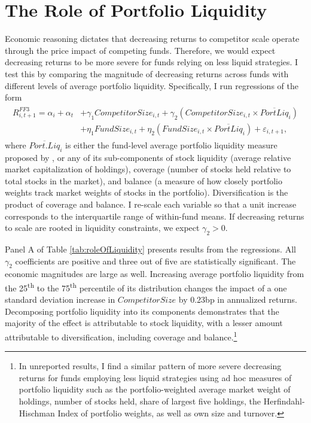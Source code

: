 \documentclass[openany]{book}
\let\rmarkdownfootnote\footnote%
\def\footnote{\protect\rmarkdownfootnote}
\theoremstyle{definition}
\theoremstyle{definition}
\theoremstyle{definition}
\theoremstyle{remark}
\begin{document}
\hypertarget{sec:heterogeneity}{%
\section{The Role of Portfolio Liquidity}\label{sec:heterogeneity}}

Economic reasoning dictates that decreasing returns to competitor scale
operate through the price impact of competing funds. Therefore, we would
expect decreasing returns to be more severe for funds relying on less
liquid strategies. I test this by comparing the magnitude of decreasing
returns across funds with different levels of average portfolio
liquidity. Specifically, I run regressions of the form \begin{align}
\begin{split}
R^{FF3}_{i,t+1} = \alpha_i + \alpha_t &+ \gamma_1 CompetitorSize_{i,t} + \gamma_2 \left( CompetitorSize_{i,t} \times \overline{PortLiq}_{i} \right) \\ 
&+ \eta_1 FundSize_{i,t} + \eta_2 \left( FundSize_{i,t} \times \overline{PortLiq}_i \right) + \varepsilon_{i,t+1},
\end{split}
\label{eq:AvgLiqReg}
\end{align} where \(\overline{Port.Liq}_i\) is either the fund-level
average portfolio liquidity measure proposed by \citet{pst17L}, or any
of its sub-components of stock liquidity (average relative market
capitalization of holdings), coverage (number of stocks held relative to
total stocks in the market), and balance (a measure of how closely
portfolio weights track market weights of stocks in the portfolio).
Diversification is the product of coverage and balance. I re-scale each
variable so that a unit increase corresponds to the interquartile range
of within-fund means. If decreasing returns to scale are rooted in
liquidity constraints, we expect \(\gamma_2>0\).

Panel A of Table \ref{tab:roleOfLiquidity} presents results from the
regressions. All \(\gamma_2\) coefficients are positive and three out of
five are statistically significant. The economic magnitudes are large as
well. Increasing average portfolio liquidity from the
25\textsuperscript{th} to the 75\textsuperscript{th} percentile of its
distribution changes the impact of a one standard deviation increase in
\(CompetitorSize\) by 0.23bp in annualized returns. Decomposing
portfolio liquidity into its components demonstrates that the majority
of the effect is attributable to stock liquidity, with a lesser amount
attributable to diversification, including coverage and
balance.\footnote{In unreported results, I find a similar pattern of
  more severe decreasing returns for funds employing less liquid
  strategies using ad hoc measures of portfolio liquidity such as the
  portfolio-weighted average market weight of holdings, number of stocks
  held, share of largest five holdings, the Herfindahl-Hischman Index of
  portfolio weights, as well as own size and turnover.}
\end{document}
